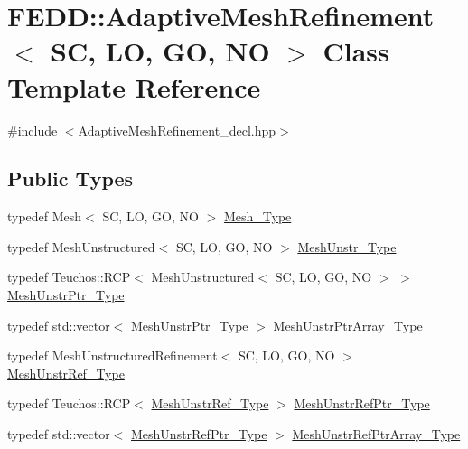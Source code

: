 \hypertarget{classFEDD_1_1AdaptiveMeshRefinement}{}\section{F\+E\+DD\+:\+:Adaptive\+Mesh\+Refinement$<$ SC, LO, GO, NO $>$ Class Template Reference}
\label{classFEDD_1_1AdaptiveMeshRefinement}


{\ttfamily \#include $<$Adaptive\+Mesh\+Refinement\+\_\+decl.\+hpp$>$}

\subsection*{Public Types}
\begin{DoxyCompactItemize}
\item 
typedef Mesh$<$ SC, LO, GO, NO $>$ \hyperlink{classFEDD_1_1AdaptiveMeshRefinement_a7d24de886f92d012c43fbe13d884f08b}{Mesh\+\_\+\+Type}
\item 
typedef Mesh\+Unstructured$<$ SC, LO, GO, NO $>$ \hyperlink{classFEDD_1_1AdaptiveMeshRefinement_ad5319bc1d767943b4746128c4392679a}{Mesh\+Unstr\+\_\+\+Type}
\item 
typedef Teuchos\+::\+R\+CP$<$ Mesh\+Unstructured$<$ SC, LO, GO, NO $>$ $>$ \hyperlink{classFEDD_1_1AdaptiveMeshRefinement_abc927c0c0253b094c3c53338f9128d20}{Mesh\+Unstr\+Ptr\+\_\+\+Type}
\item 
typedef std\+::vector$<$ \hyperlink{classFEDD_1_1AdaptiveMeshRefinement_abc927c0c0253b094c3c53338f9128d20}{Mesh\+Unstr\+Ptr\+\_\+\+Type} $>$ \hyperlink{classFEDD_1_1AdaptiveMeshRefinement_aae5b66cd506467dbeff01795c41cafcb}{Mesh\+Unstr\+Ptr\+Array\+\_\+\+Type}
\item 
typedef Mesh\+Unstructured\+Refinement$<$ SC, LO, GO, NO $>$ \hyperlink{classFEDD_1_1AdaptiveMeshRefinement_ade0625d6a1aa9c3586f3b04abb0a9e5e}{Mesh\+Unstr\+Ref\+\_\+\+Type}
\item 
typedef Teuchos\+::\+R\+CP$<$ \hyperlink{classFEDD_1_1AdaptiveMeshRefinement_ade0625d6a1aa9c3586f3b04abb0a9e5e}{Mesh\+Unstr\+Ref\+\_\+\+Type} $>$ \hyperlink{classFEDD_1_1AdaptiveMeshRefinement_ad166d4fc2a5e64ed6c4b5ee3941c77bf}{Mesh\+Unstr\+Ref\+Ptr\+\_\+\+Type}
\item 
typedef std\+::vector$<$ \hyperlink{classFEDD_1_1AdaptiveMeshRefinement_ad166d4fc2a5e64ed6c4b5ee3941c77bf}{Mesh\+Unstr\+Ref\+Ptr\+\_\+\+Type} $>$ \hyperlink{classFEDD_1_1AdaptiveMeshRefinement_a9d1410723e7af7a2835cc294934fba65}{Mesh\+Unstr\+Ref\+Ptr\+Array\+\_\+\+Type}

\end{DoxyCompactItemize}
